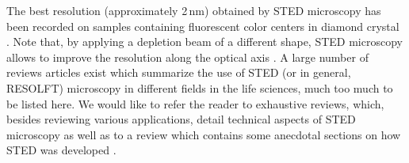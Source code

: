 The best resolution (approximately 2\,nm) obtained by STED microscopy has
been recorded on samples containing fluorescent color centers in diamond
crystal \cite{Wildanger2012}. Note that, by applying a depletion beam of a
different shape, STED microscopy allows to improve the resolution along the
optical axis \cite{Wildanger2009}. A large number of reviews articles exist
which summarize the use of STED (or in general, RESOLFT) microscopy in different
fields in the life sciences, much too much to be listed here. We would like to
refer the reader to exhaustive reviews, which, besides
reviewing various applications, detail technical aspects of STED microscopy
\cite{Turkowyd2016,Blom2017} as well as to a review which contains some
anecdotal sections on how STED was developed \cite{Sahl2019}.














